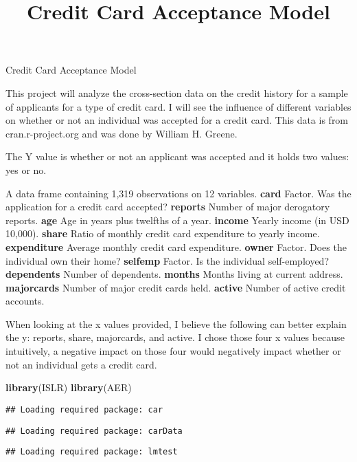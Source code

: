 \documentclass[]{article}
\title{Credit Card Acceptance Model}
\author{}
\date{\vspace{-2.5em}}
\newenvironment{Shaded}{\begin{snugshade}}{\end{snugshade}}
\newcommand{\KeywordTok}[1]{\textcolor[rgb]{0.13,0.29,0.53}{\textbf{#1}}}
\newcommand{\NormalTok}[1]{#1}
\begin{document}
\maketitle

Credit Card Acceptance Model

This project will analyze the cross-section data on the credit history
for a sample of applicants for a type of credit card. I will see the
influence of different variables on whether or not an individual was
accepted for a credit card. This data is from cran.r-project.org and was
done by William H. Greene.

The Y value is whether or not an applicant was accepted and it holds two
values: yes or no.

A data frame containing 1,319 observations on 12 variables.
\textbf{card} Factor. Was the application for a credit card accepted?
\textbf{reports} Number of major derogatory reports. \textbf{age} Age in
years plus twelfths of a year. \textbf{income} Yearly income (in USD
10,000). \textbf{share} Ratio of monthly credit card expenditure to
yearly income. \textbf{expenditure} Average monthly credit card
expenditure. \textbf{owner} Factor. Does the individual own their home?
\textbf{selfemp} Factor. Is the individual self-employed?
\textbf{dependents} Number of dependents. \textbf{months} Months living
at current address. \textbf{majorcards} Number of major credit cards
held. \textbf{active} Number of active credit accounts.

When looking at the x values provided, I believe the following can
better explain the y: reports, share, majorcards, and active. I chose
those four x values because intuitively, a negative impact on those four
would negatively impact whether or not an individual gets a credit card.

\begin{Shaded}
\begin{Highlighting}[]
\KeywordTok{library}\NormalTok{(ISLR)}
\KeywordTok{library}\NormalTok{(AER)}
\end{Highlighting}
\end{Shaded}

\begin{verbatim}
## Loading required package: car
\end{verbatim}

\begin{verbatim}
## Loading required package: carData
\end{verbatim}

\begin{verbatim}
## Loading required package: lmtest
\end{verbatim}
\end{document}
